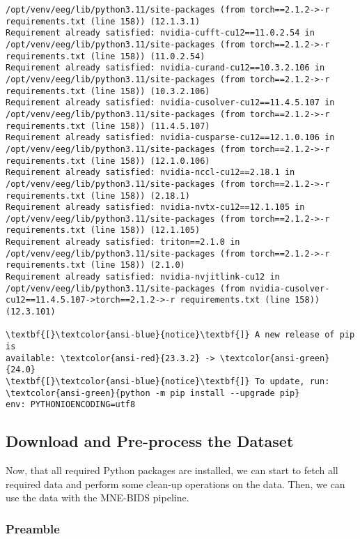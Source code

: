 \documentclass[11pt]{article}
\begin{document}
\begin{Verbatim}[commandchars=\\\{\}]
/opt/venv/eeg/lib/python3.11/site-packages (from torch==2.1.2->-r
requirements.txt (line 158)) (12.1.3.1)
Requirement already satisfied: nvidia-cufft-cu12==11.0.2.54 in
/opt/venv/eeg/lib/python3.11/site-packages (from torch==2.1.2->-r
requirements.txt (line 158)) (11.0.2.54)
Requirement already satisfied: nvidia-curand-cu12==10.3.2.106 in
/opt/venv/eeg/lib/python3.11/site-packages (from torch==2.1.2->-r
requirements.txt (line 158)) (10.3.2.106)
Requirement already satisfied: nvidia-cusolver-cu12==11.4.5.107 in
/opt/venv/eeg/lib/python3.11/site-packages (from torch==2.1.2->-r
requirements.txt (line 158)) (11.4.5.107)
Requirement already satisfied: nvidia-cusparse-cu12==12.1.0.106 in
/opt/venv/eeg/lib/python3.11/site-packages (from torch==2.1.2->-r
requirements.txt (line 158)) (12.1.0.106)
Requirement already satisfied: nvidia-nccl-cu12==2.18.1 in
/opt/venv/eeg/lib/python3.11/site-packages (from torch==2.1.2->-r
requirements.txt (line 158)) (2.18.1)
Requirement already satisfied: nvidia-nvtx-cu12==12.1.105 in
/opt/venv/eeg/lib/python3.11/site-packages (from torch==2.1.2->-r
requirements.txt (line 158)) (12.1.105)
Requirement already satisfied: triton==2.1.0 in
/opt/venv/eeg/lib/python3.11/site-packages (from torch==2.1.2->-r
requirements.txt (line 158)) (2.1.0)
Requirement already satisfied: nvidia-nvjitlink-cu12 in
/opt/venv/eeg/lib/python3.11/site-packages (from nvidia-cusolver-
cu12==11.4.5.107->torch==2.1.2->-r requirements.txt (line 158)) (12.3.101)

\textbf{[}\textcolor{ansi-blue}{notice}\textbf{]} A new release of pip is
available: \textcolor{ansi-red}{23.3.2} -> \textcolor{ansi-green}{24.0}
\textbf{[}\textcolor{ansi-blue}{notice}\textbf{]} To update, run:
\textcolor{ansi-green}{python -m pip install --upgrade pip}
env: PYTHONIOENCODING=utf8
    \end{Verbatim}

    \subsection{Download and Pre-process the
Dataset}\label{download-and-pre-process-the-dataset}

Now, that all required Python packages are installed, we can start to
fetch all required data and perform some clean-up operations on the
data. Then, we can use the data with the MNE-BIDS pipeline.

\subsubsection{Preamble}\label{preamble}
\end{document}
